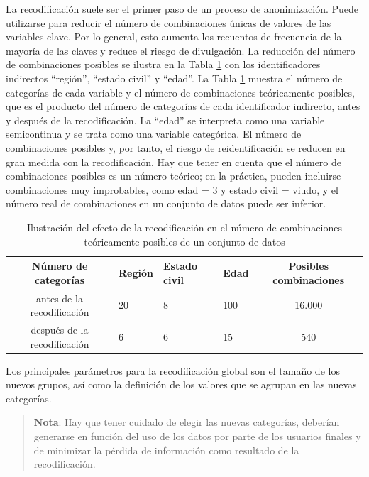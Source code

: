 \documentclass[]{book}
\theoremstyle{definition}
\theoremstyle{definition}
\theoremstyle{definition}
\theoremstyle{definition}
\theoremstyle{remark}
\begin{document}
La recodificación suele ser el primer paso de un proceso de anonimización. Puede utilizarse para reducir el número de combinaciones únicas de valores de las variables clave. Por lo general, esto aumenta los recuentos de frecuencia de la mayoría de las claves y reduce el riesgo de divulgación. La reducción del número de combinaciones posibles se ilustra en la Tabla \ref{tab:Tabla8} con los identificadores indirectos ``región'', ``estado civil'' y ``edad''. La Tabla \ref{tab:Tabla8} muestra el número de categorías de cada variable y el número de combinaciones teóricamente posibles, que es el producto del número de categorías de cada identificador indirecto, antes y después de la recodificación. La ``edad'' se interpreta como una variable semicontinua y se trata como una variable categórica. El número de combinaciones posibles y, por tanto, el riesgo de reidentificación se reducen en gran medida con la recodificación. Hay que tener en cuenta que el número de combinaciones posibles es un número teórico; en la práctica, pueden incluirse combinaciones muy improbables, como edad = 3 y estado civil = viudo, y el número real de combinaciones en un conjunto de datos puede ser inferior.

\begin{table}

\caption{\label{tab:Tabla8}\label{tab:Tabla8}Ilustración del efecto de la recodificación en el número de combinaciones teóricamente posibles de un conjunto de datos}
\centering
\begin{tabular}[t]{clllc}
\toprule
Número de   categorías & Región & Estado civil & Edad & Posibles   combinaciones\\
\midrule
antes de la recodificación & 20 & 8 & 100 & 16.000\\
después de la recodificación & 6 & 6 & 15 & 540\\
\bottomrule
\end{tabular}
\end{table}

Los principales parámetros para la recodificación global son el tamaño de los nuevos grupos, así como la definición de los valores que se agrupan en las nuevas categorías.

\begin{quote}
\textbf{Nota}: Hay que tener cuidado de elegir las nuevas categorías, deberían generarse en función del uso de los datos por parte de los usuarios finales y de minimizar la pérdida de información como resultado de la recodificación.
\end{quote}
\end{document}
